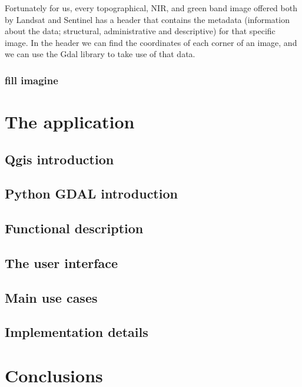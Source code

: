 \documentclass[12pt, a4paper]{report}
\begin{document}
Fortunately for us, every topographical, NIR, and green band image offered both by Landsat and Sentinel has a header that contains the metadata (information about the data; structural, administrative and descriptive) for that specific image. In the header we can find the coordinates of each corner of an image, and we can use the Gdal library to take use of that data. 




\subsection{fill imagine}




\chapter{The application}

\section{Qgis introduction} 


\section{Python GDAL introduction} 

\section{Functional description} 


\section{The user interface}


\section{Main use cases}


\section{Implementation details}

\newpage



\newpage{}

\chapter{Conclusions}
\end{document}

